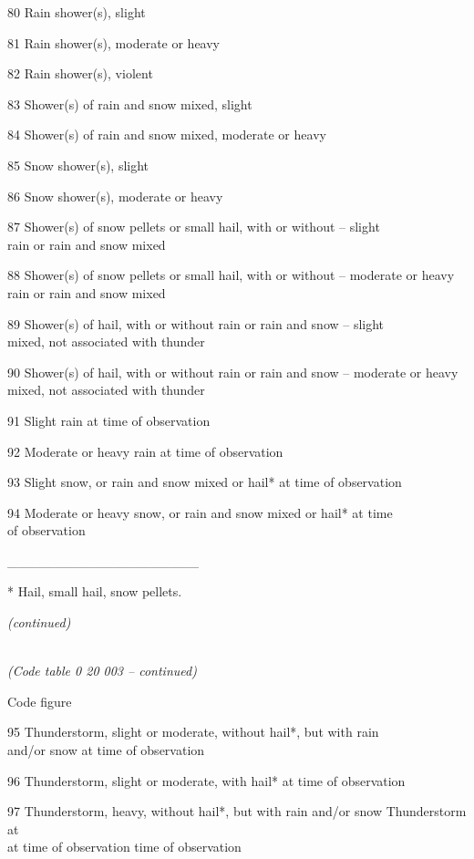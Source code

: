 80 Rain shower(s), slight

81 Rain shower(s), moderate or heavy

82 Rain shower(s), violent

83 Shower(s) of rain and snow mixed, slight

84 Shower(s) of rain and snow mixed, moderate or heavy

85 Snow shower(s), slight

86 Snow shower(s), moderate or heavy

87 Shower(s) of snow pellets or small hail, with or without -- slight\\
rain or rain and snow mixed

88 Shower(s) of snow pellets or small hail, with or without -- moderate or heavy\\
rain or rain and snow mixed

89 Shower(s) of hail, with or without rain or rain and snow -- slight\\
mixed, not associated with thunder

90 Shower(s) of hail, with or without rain or rain and snow -- moderate or heavy\\
mixed, not associated with thunder

91 Slight rain at time of observation

92 Moderate or heavy rain at time of observation

93 Slight snow, or rain and snow mixed or hail* at time of observation

94 Moderate or heavy snow, or rain and snow mixed or hail* at time\\
of observation

\_\_\_\_\_\_\_\_\_\_\_\_\_\_\_\_\_\_\_\_

* Hail, small hail, snow pellets.

\emph{(continued)}

\emph{\\
(Code table 0 20 003 -- continued)}

Code figure

95 Thunderstorm, slight or moderate, without hail*, but with rain\\
and/or snow at time of observation

96 Thunderstorm, slight or moderate, with hail* at time of observation

97 Thunderstorm, heavy, without hail*, but with rain and/or snow Thunderstorm at\\
at time of observation time of observation

